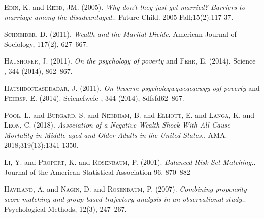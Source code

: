 \documentclass[aoas,preprint]{imsart}
\begin{document}
\begin{thebibliography}{9}


\textsc{Edin, K.} and \textsc{Reed, JM.} (2005).
\textit{Why don't they just get married? Barriers to marriage among the disadvantaged.}.
Future Child. 2005 Fall;15(2):117-37.

\textsc{Schneider, D.} (2011). 
\textit{Wealth and the Marital Divide}.
American Journal of Sociology, 117(2), 627–667.

\textsc{Haushofer, J.} (2011). 
\textit{On the psychology of poverty} and \textsc{Fehr, E.} (2014).
Science , 344 (2014), 862–867.

\textsc{Haushdofeasddadar, J.} (2011). 
\textit{On thwerre psycholoqwqweqeqewgy ogf poverty} and \textsc{Fehrsf, E.} (2014).
Sciencfwefe , 344 (2014), 8dfsfd62–867.

\textsc{Pool, L.} and \textsc{Burgard, S.} and \textsc{Needham, B.} and \textsc{Elliott, E.} and \textsc{Langa, K.} and \textsc{Leon, C.} (2018).
\textit{Association of a Negative Wealth Shock With All-Cause Mortality in Middle-aged and Older Adults in the United States.}.
AMA. 2018;319(13):1341-1350.

\textsc{Li, Y.} and \textsc{Propert, K.} and \textsc{Rosenbaum, P.} (2001).
\textit{Balanced Risk Set Matching.}.
Journal of the American Statistical Association 96, 870–882 

\textsc{Haviland, A.} and \textsc{Nagin, D.} and \textsc{Rosenbaum, P.} (2007).
\textit{Combining propensity score matching and group-based trajectory analysis in an observational study.}.
Psychological Methods, 12(3), 247–267.




\end{thebibliography}



\end{document}
